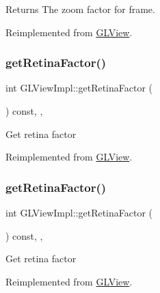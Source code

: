 \begin{DoxyReturn}{Returns}
The zoom factor for frame. 
\end{DoxyReturn}


Reimplemented from \hyperlink{classGLView_ab804d7568f68b8d91cf420d1c0057f38}{G\+L\+View}.

\mbox{\label{classGLViewImpl_a0844b876076edafc4f6e47e3fafb16da}} 
\subsubsection{\texorpdfstring{get\+Retina\+Factor()}{getRetinaFactor()}\hspace{0.1cm}{\footnotesize\ttfamily [1/2]}}
{\footnotesize\ttfamily int G\+L\+View\+Impl\+::get\+Retina\+Factor (\begin{DoxyParamCaption}{ }\end{DoxyParamCaption}) const\hspace{0.3cm}{\ttfamily [inline]}, {\ttfamily [override]}, {\ttfamily [virtual]}}

Get retina factor 

Reimplemented from \hyperlink{classGLView_a5dd430351b6192d7c014458e7863ba6d}{G\+L\+View}.

\mbox{\label{classGLViewImpl_a0844b876076edafc4f6e47e3fafb16da}} 
\subsubsection{\texorpdfstring{get\+Retina\+Factor()}{getRetinaFactor()}\hspace{0.1cm}{\footnotesize\ttfamily [2/2]}}
{\footnotesize\ttfamily int G\+L\+View\+Impl\+::get\+Retina\+Factor (\begin{DoxyParamCaption}{ }\end{DoxyParamCaption}) const\hspace{0.3cm}{\ttfamily [inline]}, {\ttfamily [override]}, {\ttfamily [virtual]}}

Get retina factor 

Reimplemented from \hyperlink{classGLView_a5dd430351b6192d7c014458e7863ba6d}{G\+L\+View}.

